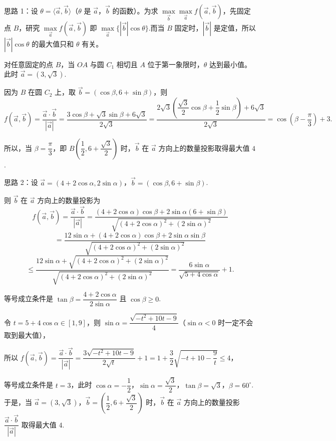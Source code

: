 \begin{solutions}
思路 1：设 $\theta=\langle\vec{a},\vec{b}\rangle$（$\theta$ 是 $\vec{a}$，$\vec{b}$ 的函数）。为求 $\max\limits_{\vec{b}}\max\limits_{\vec{a}}f(\vec{a},\vec{b})$，先固定点 $B$，研究 $\max\limits_{\vec{a}}f(\vec{a},\vec{b})$ 即 $\max\limits_{\vec{a}}\{|\vec{b}|\cos\theta\}$.而当 $B$ 固定时，$|\vec{b}|$ 是定值，所以 $|\vec{b}|\cos\theta$ 的最大值只和 $\theta$ 有关。

对任意固定的点 $B$，当 $OA$ 与圆 $C_1$ 相切且 $A$ 位于第一象限时，$\theta$ 达到最小值。此时 $\vec{a}=(3,\sqrt{3})$.

因为 $B$ 在圆 $C_2$ 上，取 $\vec{b}=(\cos\beta,6+\sin\beta)$，则
$$
f(\vec{a},\vec{b})=\dfrac{\vec{a}\cdot\vec{b}}{|\vec{a}|}=\dfrac{3\cos\beta+\sqrt{3}\sin\beta+6\sqrt{3}}{2\sqrt{3}}=\dfrac{2\sqrt{3}\left(\dfrac{\sqrt{3}}{2}\cos\beta+\dfrac{1}{2}\sin\beta\right)+6\sqrt{3}}{2\sqrt{3}}=\cos\left(\beta-\dfrac{\pi}{3}\right)+3.
$$

所以，当 $\beta=\dfrac{\pi}{3}$，即 $B\left(\dfrac{1}{2},6+\dfrac{\sqrt{3}}{2}\right)$ 时，$\vec{b}$ 在 $\vec{a}$ 方向上的数量投影取得最大值 $4$.

思路 2：设 $\vec{a}=(4+2\cos\alpha,2\sin\alpha)$，$\vec{b}=(\cos\beta,6+\sin\beta)$.

则 $\vec{b}$ 在 $\vec{a}$ 方向上的数量投影为
$$
f(\vec{a},\vec{b})=\dfrac{\vec{a}\cdot\vec{b}}{|\vec{a}|}=\dfrac{(4+2\cos\alpha)\cos\beta+2\sin\alpha(6+\sin\beta)}{\sqrt{(4+2\cos\alpha)^2+(2\sin\alpha)^2}}
$$
$$
=\dfrac{12\sin\alpha+(4+2\cos\alpha)\cos\beta+2\sin\alpha\sin\beta}{\sqrt{(4+2\cos\alpha)^2+(2\sin\alpha)^2}}
$$
$$
\leqslant\dfrac{12\sin\alpha+\sqrt{(4+2\cos\alpha)^2+(2\sin\alpha)^2}}{\sqrt{(4+2\cos\alpha)^2+(2\sin\alpha)^2}}=\dfrac{6\sin\alpha}{\sqrt{5+4\cos\alpha}}+1.
$$

等号成立条件是 $\tan\beta=\dfrac{4+2\cos\alpha}{2\sin\alpha}$ 且 $\cos\beta\geqslant0$.

令 $t=5+4\cos\alpha\in[1,9]$，则 $\sin\alpha=\dfrac{\sqrt{-t^2+10t-9}}{4}$（$\sin\alpha<0$ 时一定不会取到最大值），

所以 $f(\vec{a},\vec{b})=\dfrac{\vec{a}\cdot\vec{b}}{|\vec{a}|}=\dfrac{3\sqrt{-t^2+10t-9}}{2\sqrt{t}}+1=1+\dfrac{3}{2}\sqrt{-t+10-\dfrac{9}{t}}\leqslant4$，

等号成立条件是 $t=3$，此时 $\cos\alpha=-\dfrac{1}{2}$，$\sin\alpha=\dfrac{\sqrt{3}}{2}$，$\tan\beta=\sqrt{3}$，$\beta=60^\circ$.于是，当 $\vec{a}=(3,\sqrt{3})$，$\vec{b}=\left(\dfrac{1}{2},6+\dfrac{\sqrt{3}}{2}\right)$ 时，$\vec{b}$ 在 $\vec{a}$ 方向上的数量投影 $\dfrac{\vec{a}\cdot\vec{b}}{|\vec{a}|}$ 取得最大值 $4$.
\end{solutions}